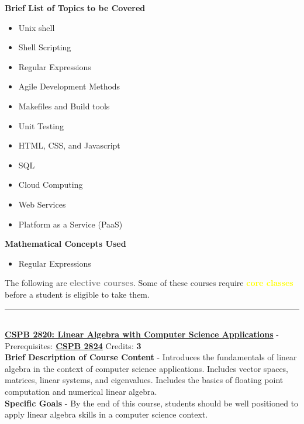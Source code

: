 \documentclass{article}
\newcommand{\horizontalline}{\noindent \rule{\textwidth}{0.5pt} \\}
\begin{document}
\noindent \textbf{Brief List of Topics to be Covered}
\begin{itemize}
    \item Unix shell
    \item Shell Scripting
    \item Regular Expressions
    \item Agile Development Methods
    \item Makefiles and Build tools
    \item Unit Testing
    \item HTML, CSS, and Javascript
    \item SQL
    \item Cloud Computing
    \item Web Services
    \item Platform as a Service (PaaS)
\end{itemize}

\noindent \textbf{Mathematical Concepts Used}
\begin{itemize}
    \item Regular Expressions
\end{itemize}

\noindent The following are \textcolor{gray}{\textbf{elective courses}}. Some of these courses require \textcolor{yellow}{\textbf{core classes}} before a student is eligible to take them.

\horizontalline
\noindent \href{https://www.colorado.edu/program/cspb/cspb-2820-–-linear-algebra-computer-science-applications}{\textbf{CSPB 2820: Linear Algebra with Computer Science Applications}} - Prerequisites: \href{https://www.colorado.edu/program/cspb/cspb-2824-discrete-structures}{\textbf{CSPB 2824}} Credits: \textbf{3} \\

\noindent \textbf{Brief Description of Course Content} - Introduces the fundamentals of linear algebra in the context of computer science applications. Includes vector spaces, matrices, linear systems, and eigenvalues. Includes the basics of floating point computation and numerical linear algebra. \\

\noindent \textbf{Specific Goals} - By the end of this course, students should be well positioned to apply linear algebra skills in a computer science context. \\
\end{document}
